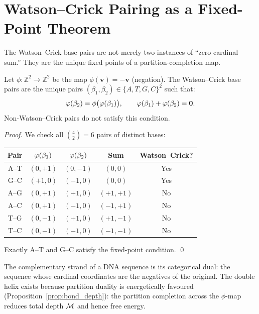 \section{Watson--Crick Pairing as a Fixed-Point Theorem}
\label{sec:wc_fixedpoint}

The Watson--Crick base pairs are not merely two instances of ``zero cardinal
sum.'' They are the unique fixed points of a partition-completion map.

\begin{theorem}
\label{thm:wc_fixedpoint}
Let $\phi: \mathbb{Z}^2 \to \mathbb{Z}^2$ be the map $\phi(\mathbf{v}) = -\mathbf{v}$
(negation). The Watson--Crick base pairs are the unique pairs
$(\beta_1, \beta_2) \in \{A,T,G,C\}^2$ such that:
\begin{equation}
  \varphi(\beta_2) = \phi\bigl(\varphi(\beta_1)\bigr),
  \qquad \varphi(\beta_1) + \varphi(\beta_2) = \mathbf{0}.
\end{equation}
Non-Watson--Crick pairs do not satisfy this condition.
\end{theorem}

\begin{proof}
We check all $\binom{4}{2} = 6$ pairs of distinct bases:
\begin{center}
\begin{tabular}{ccccc}
\toprule
Pair & $\varphi(\beta_1)$ & $\varphi(\beta_2)$ & Sum & Watson--Crick? \\
\midrule
A--T & $(0,+1)$ & $(0,-1)$ & $(0,0)$ & Yes \\
G--C & $(+1,0)$ & $(-1,0)$ & $(0,0)$ & Yes \\
A--G & $(0,+1)$ & $(+1,0)$ & $(+1,+1)$ & No \\
A--C & $(0,+1)$ & $(-1,0)$ & $(-1,+1)$ & No \\
T--G & $(0,-1)$ & $(+1,0)$ & $(+1,-1)$ & No \\
T--C & $(0,-1)$ & $(-1,0)$ & $(-1,-1)$ & No \\
\bottomrule
\end{tabular}
\end{center}
Exactly A--T and G--C satisfy the fixed-point condition. \qed
\end{proof}

\begin{corollary}
\label{cor:strand_duality}
The complementary strand of a DNA sequence is its categorical dual:
the sequence whose cardinal coordinates are the negatives of the original.
The double helix exists because partition duality is energetically favoured
(Proposition~\ref{prop:bond_depth}): the partition completion across the
$\phi$-map reduces total depth $\mathcal{M}$ and hence free energy.
\end{corollary}

